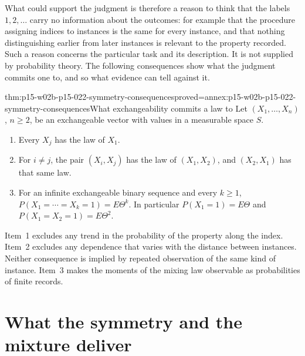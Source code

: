 What could support the judgment is therefore a reason to think that the
labels \(1,2,\ldots\) carry no information about the outcomes: for example
that the procedure assigning indices to instances is the same for every
instance, and that nothing distinguishing earlier from later instances is
relevant to the property recorded. Such a reason concerns the particular
task and its description. It is not supplied by probability theory. The
following consequences show what the judgment commits one to, and so what
evidence can tell against it.

\begin{hblemma}{thm:p15-w02b-p15-022-symmetry-consequences}{proved=annex:p15-w02b-p15-022-symmetry-consequences}{What exchangeability commits a law to}
Let \((X_1,\ldots,X_n)\), \(n\geq2\), be an exchangeable vector with values
in a measurable space \(S\).
\begin{enumerate}
\item Every \(X_j\) has the law of \(X_1\).
\item For \(i\neq j\), the pair \((X_i,X_j)\) has the law of \((X_1,X_2)\),
      and \((X_2,X_1)\) has that same law.
\item For an infinite exchangeable binary sequence and every \(k\geq1\),
      \(P(X_1=\cdots=X_k=1)=E\Theta^k\). In particular
      \(P(X_1=1)=E\Theta\) and \(P(X_1=X_2=1)=E\Theta^2\).
\end{enumerate}
\end{hblemma}

Item~1 excludes any trend in the probability of the property along the
index. Item~2 excludes any dependence that varies with the distance
between instances. Neither consequence is implied by repeated observation of
the same kind of instance. Item~3 makes the moments of the mixing law
observable as probabilities of finite records.

\section{What the symmetry and the mixture deliver}
\label{sec:p15-w02b-p15-022-conclusion}

